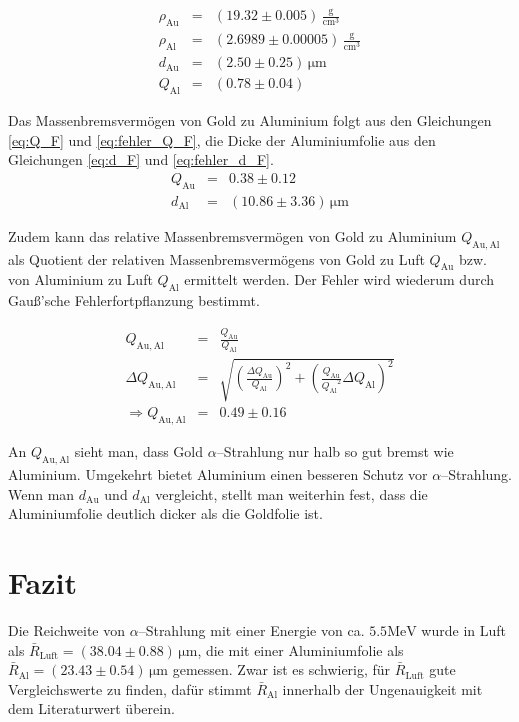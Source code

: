 \documentclass[12pt,a4paper]{scrartcl}
\numberwithin{equation}{section} %
\begin{document}
\begin{eqnarray}
	\rho_\mathrm{Au} &=& (19.32 \pm 0.005) \mathrm{\, \frac{g}{cm^3}}\\
	\rho_\mathrm{Al} &=& (2.6989 \pm 0.00005) \mathrm{\, \frac{g}{cm^3}}\\
	d_\mathrm{Au} &=& (2.50 \pm 0.25) \mathrm{\, \mu m}\\
	Q_\mathrm{Al} &=& (0.78 \pm 0.04)
\end{eqnarray}

\noindent
Das Massenbremsvermögen von Gold zu Aluminium folgt aus den Gleichungen \eqref{eq:Q_F} und \eqref{eq:fehler_Q_F}, die Dicke der Aluminiumfolie aus den Gleichungen \eqref{eq:d_F} und \eqref{eq:fehler_d_F}.
\begin{eqnarray}
	Q_\mathrm{Au} &=& 0.38 \pm 0.12 \\
	d_\mathrm{Al} &=& (10.86 \pm 3.36) \mathrm{\, \mu m}
\end{eqnarray}

\noindent
Zudem kann das relative Massenbremsvermögen von Gold zu Aluminium $Q_\mathrm{Au, Al}$ als Quotient der relativen Massenbremsvermögens von Gold zu Luft $Q_\mathrm{Au}$ bzw. von Aluminium zu Luft $Q_\mathrm{Al}$ ermittelt werden. Der Fehler wird wiederum durch Gauß'sche Fehlerfortpflanzung bestimmt.

\begin{eqnarray}
	Q_\mathrm{Au, Al} &=& \frac{Q_\mathrm{Au}}{Q_\mathrm{Al}} \\
	\Delta Q_\mathrm{Au, Al} &=&
		\sqrt{
				\left(\frac{\Delta Q_\mathrm{Au}}{Q_\mathrm{Al}}\right)^2
				+ \left(\frac{Q_\mathrm{Au}}{{Q_\mathrm{Al}}^2} \Delta Q_\mathrm{Al} \right)^2
			} \\
	\Rightarrow Q_\mathrm{Au, Al} &=& 0.49 \pm 0.16
\end{eqnarray}

\noindent
An $Q_\mathrm{Au, Al}$ sieht man, dass Gold $\alpha$--Strahlung nur halb so gut bremst wie Aluminium. Umgekehrt bietet Aluminium einen besseren Schutz vor $\alpha$--Strahlung. Wenn man $d_\mathrm{Au}$ und $d_\mathrm{Al}$ vergleicht, stellt man weiterhin fest, dass die Aluminiumfolie deutlich dicker als die Goldfolie ist.

\clearpage
\hypertarget{fazit}{\section{Fazit}\label{fazit}}
Die Reichweite von $\alpha$--Strahlung mit einer Energie von ca. $5.5\mathrm{MeV}$ wurde in Luft als $\bar R_\mathrm{Luft} = (38.04 \pm 0.88) \mathrm{\, \mu m}$, die mit einer Aluminiumfolie als $\bar R_\mathrm{Al} = (23.43 \pm 0.54) \mathrm{\, \mu m}$ gemessen. Zwar ist es schwierig, für $\bar R_\mathrm{Luft}$ gute Vergleichswerte zu finden, dafür stimmt $\bar R_\mathrm{Al}$ innerhalb der Ungenauigkeit mit dem Literaturwert überein.
\end{document}
